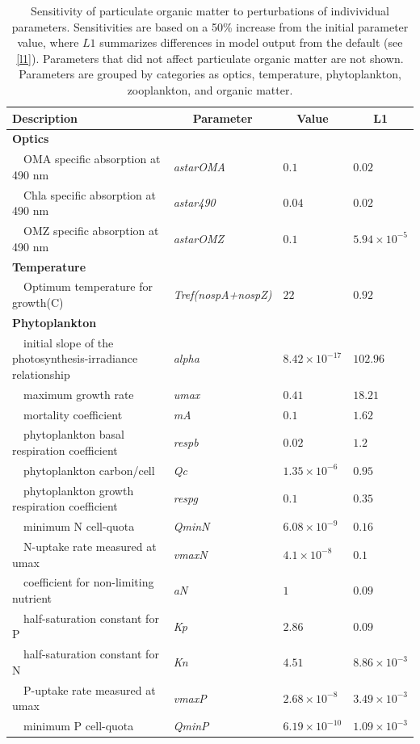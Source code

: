 \documentclass[letterpaper,12pt,oneside]{article}\usepackage[]{graphicx}\usepackage[]{color}
\begin{document}
\begin{table}[!tbp]
{\footnotesize
\caption{Sensitivity of particulate organic matter to perturbations of indivividual parameters.  Sensitivities are based on a 50\% increase from the initial parameter value, where $L1$ summarizes differences in model output from the default (see \cref{l1}).  Parameters that did not affect particulate organic matter are not shown.  Parameters are grouped by categories as optics, temperature, phytoplankton, zooplankton, and organic matter.\label{tab:om1sens}} 
\begin{center}
\begin{tabular}{llll}
\hline\hline
\multicolumn{1}{l}{Description}&\multicolumn{1}{c}{Parameter}&\multicolumn{1}{c}{Value}&\multicolumn{1}{c}{L1}\tabularnewline
\hline
{\bfseries Optics}&&&\tabularnewline
~~OMA specific absorption at 490 nm&\textit{astarOMA}&$0.1$&$0.02$\tabularnewline
~~Chla specific absorption at 490 nm&\textit{astar490}&$0.04$&$0.02$\tabularnewline
~~OMZ specific absorption at 490 nm&\textit{astarOMZ}&$0.1$&$5.94\times 10^{-5}$\tabularnewline
\hline
{\bfseries Temperature}&&&\tabularnewline
~~Optimum temperature for growth(C)&\textit{Tref(nospA+nospZ)}&$22$&$0.92$\tabularnewline
\hline
{\bfseries Phytoplankton}&&&\tabularnewline
~~initial slope of the photosynthesis-irradiance relationship&\textit{alpha}&$8.42\times 10^{-17}$&$102.96$\tabularnewline
~~maximum growth rate&\textit{umax}&$0.41$&$18.21$\tabularnewline
~~mortality coefficient&\textit{mA}&$0.1$&$1.62$\tabularnewline
~~phytoplankton basal respiration coefficient&\textit{respb}&$0.02$&$1.2$\tabularnewline
~~phytoplankton carbon/cell&\textit{Qc}&$1.35\times 10^{-6}$&$0.95$\tabularnewline
~~phytoplankton growth respiration coefficient&\textit{respg}&$0.1$&$0.35$\tabularnewline
~~minimum N cell-quota&\textit{QminN}&$6.08\times 10^{-9}$&$0.16$\tabularnewline
~~N-uptake rate measured at umax&\textit{vmaxN}&$4.1\times 10^{-8}$&$0.1$\tabularnewline
~~coefficient for non-limiting nutrient&\textit{aN}&$1$&$0.09$\tabularnewline
~~half-saturation constant for P&\textit{Kp}&$2.86$&$0.09$\tabularnewline
~~half-saturation constant for N&\textit{Kn}&$4.51$&$8.86\times 10^{-3}$\tabularnewline
~~P-uptake rate measured at umax&\textit{vmaxP}&$2.68\times 10^{-8}$&$3.49\times 10^{-3}$\tabularnewline
~~minimum P cell-quota&\textit{QminP}&$6.19\times 10^{-10}$&$1.09\times 10^{-3}$\tabularnewline

\end{tabular}
\end{center}}
\end{table}
\end{document}
